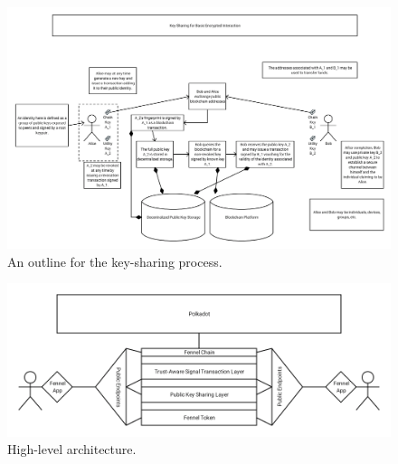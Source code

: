 \documentclass[]{article}
\begin{document}
\pagebreak
\begin{figure}[htbp]
\centering
\includegraphics[width=1.2\columnwidth]{detailed-arch.png}
\caption{An outline for the key-sharing process.}
\label{scrivauto:58}
\end{figure}
\clearpage
\begin{figure}[htbp]
\centering
\includegraphics[width=1.2\columnwidth]{arch-overview.png}
\caption{High-level architecture.}
\label{scrivauto:59}
\end{figure}

\pagebreak
\begin{appendices}
    \printindex\pagebreak
    \printglossaries{}
    \printbibliography[heading=bibintoc]{}
\end{appendices}
\end{document}

